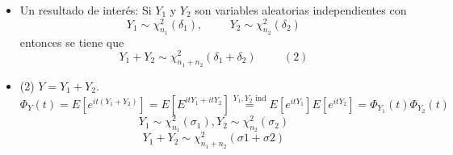 \documentclass[11pt,a4paper]{article}
\begin{document}
\begin{itemize}
\item Un resultado de interés: Si $Y_{1}$ y $Y_{2}$ son variables aleatorias independientes con
$$Y_{1} \sim \chi_{n_{1}}^{2}(\delta_{1}), \hspace{1cm} Y_{2} \sim \chi_{n_{2}}^{2}(\delta_{2})$$
entonces se tiene que
$$Y_{1} + Y_{2} \sim \chi_{n_{1}+n_{2}}^{2}(\delta_{1} + \delta_{2}) \hspace{1cm} (2)$$

\item (2) $Y = Y_{1} + Y_{2}$.
$$\Phi_{Y}(t) = E[e^{it(Y_{1}+Y_{2})}] = E[E^{itY_{1} + itY_{2}}] \overset{Y_{1}, Y_{2} \text{ ind}}{=} E[e^{itY_{1}}]E[e^{itY_{2}}] = \Phi_{Y_{1}}(t) \Phi_{Y_{2}}(t)$$
$$Y_{1} \sim \chi^{2}_{n_{1}}(\sigma_{1}), Y_{2} \sim \chi^{2}_{n_{2}}(\sigma_{2})$$
$$Y_{1} + Y_{2} \sim \chi_{n_{1}+n_{2}}^{2}(\sigma{1} + \sigma{2})$$
\end{itemize}
\end{document}
